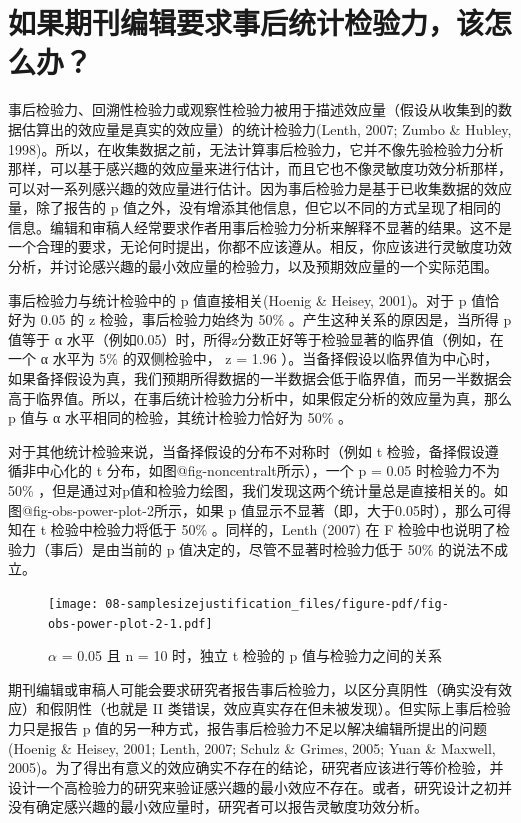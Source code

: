 \documentclass[
  letterpaper,
  DIV=11,
  numbers=noendperiod]{scrreprt}
\begin{document}
\hypertarget{sec-posthocpower}{%
\section{如果期刊编辑要求事后统计检验力，该怎么办？}\label{sec-posthocpower}}

事后检验力、回溯性检验力或观察性检验力被用于描述效应量（假设从收集到的数据估算出的效应量是真实的效应量）的统计检验力(Lenth,
2007; Zumbo \& Hubley,
1998)。所以，在收集数据之前，无法计算事后检验力，它并不像先验检验力分析那样，可以基于感兴趣的效应量来进行估计，而且它也不像灵敏度功效分析那样，可以对一系列感兴趣的效应量进行估计。因为事后检验力是基于已收集数据的效应量，除了报告的
p
值之外，没有增添其他信息，但它以不同的方式呈现了相同的信息。编辑和审稿人经常要求作者用事后检验力分析来解释不显著的结果。这不是一个合理的要求，无论何时提出，你都不应该遵从。相反，你应该进行灵敏度功效分析，并讨论感兴趣的最小效应量的检验力，以及预期效应量的一个实际范围。

事后检验力与统计检验中的 p 值直接相关(Hoenig \& Heisey, 2001)。对于 p
值恰好为 0.05 的 z 检验，事后检验力始终为 50\%
。产生这种关系的原因是，当所得 p 值等于 α
水平（例如0.05）时，所得z分数正好等于检验显著的临界值（例如，在一个 α
水平为 5\% 的双侧检验中， z = 1.96
）。当备择假设以临界值为中心时，如果备择假设为真，我们预期所得数据的一半数据会低于临界值，而另一半数据会高于临界值。所以，在事后统计检验力分析中，如果假定分析的效应量为真，那么
p 值与 α 水平相同的检验，其统计检验力恰好为 50\% 。

对于其他统计检验来说，当备择假设的分布不对称时（例如 t
检验，备择假设遵循非中心化的 t 分布，如图@fig-noncentralt所示），一个 p
= 0.05 时检验力不为 50\%
，但是通过对p值和检验力绘图，我们发现这两个统计量总是直接相关的。如图@fig-obs-power-plot-2所示，如果
p 值显示不显著（即，大于0.05时），那么可得知在 t 检验中检验力将低于 50\%
。同样的，Lenth (2007) 在 F 检验中也说明了检验力（事后）是由当前的 p
值决定的，尽管不显著时检验力低于 50\% 的说法不成立。

\begin{figure}

{\centering \texttt{[image: 08-samplesizejustification\_files/figure-pdf/fig-obs-power-plot-2-1.pdf]}

}

\caption{\label{fig-obs-power-plot-2}\(\alpha\) = 0.05 且 n = 10
时，独立 t 检验的 p 值与检验力之间的关系}

\end{figure}

期刊编辑或审稿人可能会要求研究者报告事后检验力，以区分真阴性（确实没有效应）和假阴性（也就是
II 类错误，效应真实存在但未被发现）。但实际上事后检验力只是报告 p
值的另一种方式，报告事后检验力不足以解决编辑所提出的问题(Hoenig \&
Heisey, 2001; Lenth, 2007; Schulz \& Grimes, 2005; Yuan \& Maxwell,
2005)。为了得出有意义的效应确实不存在的结论，研究者应该进行等价检验，并设计一个高检验力的研究来验证感兴趣的最小效应不存在。或者，研究设计之初并没有确定感兴趣的最小效应量时，研究者可以报告灵敏度功效分析。
\end{document}
